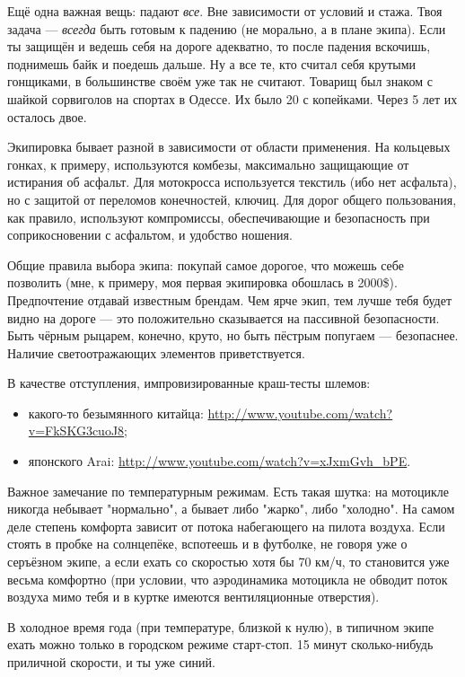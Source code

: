 \documentclass[12pt,a4paper]{article}
\begin{document}
Ещё одна важная вещь: падают \emph{все}. Вне зависимости от условий и
стажа. Твоя задача --- \emph{всегда} быть готовым к падению (не морально,
а в плане экипа). Если ты защищён и ведешь себя на дороге адекватно,
то после падения вскочишь, поднимешь байк и поедешь дальше. Ну а все
те, кто считал себя крутыми гонщиками, в большинстве своём уже так не
считают. Товарищ был знаком с шайкой сорвиголов на спортах в Одессе.
Их было 20 с копейками. Через 5 лет их осталось двое.

Экипировка бывает разной в зависимости от области применения. На
кольцевых гонках, к примеру, используются комбезы, максимально
защищающие от истирания об асфальт. Для мотокросса используется
текстиль (ибо нет асфальта), но с защитой от переломов конечностей,
ключиц. Для дорог общего пользования, как правило, используют
компромиссы, обеспечивающие и безопасность при соприкосновении с
асфальтом, и удобство ношения.

Общие правила выбора экипа: покупай самое дорогое, что можешь себе
позволить (мне, к примеру, моя первая экипировка обошлась в 2000\$).
Предпочтение отдавай известным брендам. Чем ярче экип, тем лучше тебя
будет видно на дороге --- это положительно сказывается на пассивной
безопасности. Быть чёрным рыцарем, конечно, круто, но быть пёстрым
попугаем --- безопаснее. Наличие светоотражающих элементов
приветствуется.

В качестве отступления, импровизированные краш-тесты шлемов:

\begin{itemize}
\item какого-то безымянного китайца:
\url{http://www.youtube.com/watch?v=FkSKG3cuoJ8};
\item японского Arai:
\url{http://www.youtube.com/watch?v=xJxmGvh_bPE}.
\end{itemize}

Важное замечание по температурным режимам. Есть такая шутка: на
мотоцикле никогда небывает "нормально", а бывает либо "жарко", либо
"холодно". На самом деле степень комфорта зависит от потока набегающего
на пилота воздуха. Если стоять в пробке на солнцепёке, вспотеешь и в
футболке, не говоря уже о серъёзном экипе, а если ехать со скоростью
хотя бы 70 км/ч, то становится уже весьма комфортно (при условии, что
аэродинамика мотоцикла не обводит поток воздуха мимо тебя и в куртке
имеются вентиляционные отверстия).

В холодное время года (при температуре, близкой к нулю), в типичном
экипе ехать можно только в городском режиме старт-стоп. 15 минут
сколько-нибудь приличной скорости, и ты уже синий.
\end{document}
